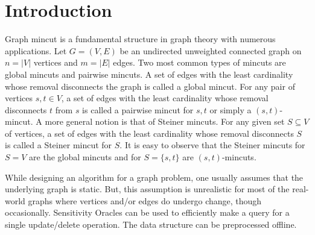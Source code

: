 \chapter{Introduction}

Graph mincut is a fundamental structure in graph theory with numerous applications. Let $G=(V,E)$ be an undirected unweighted connected graph on $n=|V|$ vertices and $m=|E|$ edges.
Two most common types of mincuts are global mincuts and pairwise mincuts. A set of edges with the least cardinality whose removal disconnects the graph is called a global mincut. For any pair of vertices $s,t\in V$, 
a set of edges with the least cardinality whose removal disconnects $t$ from $s$ is called a pairwise mincut for $s,t$ or simply a $(s,t)$-mincut. A more general notion is that of Steiner mincuts. For any given set $S\subseteq V$ of vertices, a set of edges with the least cardinality whose removal disconnects $S$ is called a Steiner mincut for $S$. It is easy to observe that the Steiner mincuts for $S=V$ are the global mincuts and for $S=\{s,t\}$ are $(s,t)$-mincuts.

While designing an algorithm for a graph problem, one usually assumes that the underlying graph is static. But, this assumption is unrealistic for most of the real-world graphs where vertices and/or edges do undergo change, though occasionally. Sensitivity Oracles can be used to efficiently make a query for a single update/delete operation. The data structure can be preprocessed offline.


